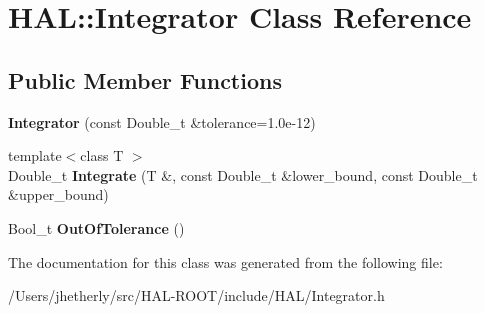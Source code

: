 \hypertarget{class_h_a_l_1_1_integrator}{\section{H\+A\+L\+:\+:Integrator Class Reference}
\label{class_h_a_l_1_1_integrator}
}
\subsection*{Public Member Functions}
\begin{DoxyCompactItemize}
\item 
\hypertarget{class_h_a_l_1_1_integrator_acd878eaa888dfce44a3c1130770a74a5}{{\bfseries Integrator} (const Double\+\_\+t \&tolerance=1.\+0e-\/12)}\label{class_h_a_l_1_1_integrator_acd878eaa888dfce44a3c1130770a74a5}

\item 
\hypertarget{class_h_a_l_1_1_integrator_a5eefbd36726dbcaaabb07cd617799661}{{\footnotesize template$<$class T $>$ }\\Double\+\_\+t {\bfseries Integrate} (T \&, const Double\+\_\+t \&lower\+\_\+bound, const Double\+\_\+t \&upper\+\_\+bound)}\label{class_h_a_l_1_1_integrator_a5eefbd36726dbcaaabb07cd617799661}

\item 
\hypertarget{class_h_a_l_1_1_integrator_ab866da7ce3499bcf3d874fac6ef1e6fc}{Bool\+\_\+t {\bfseries Out\+Of\+Tolerance} ()}\label{class_h_a_l_1_1_integrator_ab866da7ce3499bcf3d874fac6ef1e6fc}

\end{DoxyCompactItemize}


The documentation for this class was generated from the following file\+:\begin{DoxyCompactItemize}
\item 
/\+Users/jhetherly/src/\+H\+A\+L-\/\+R\+O\+O\+T/include/\+H\+A\+L/Integrator.\+h\end{DoxyCompactItemize}
